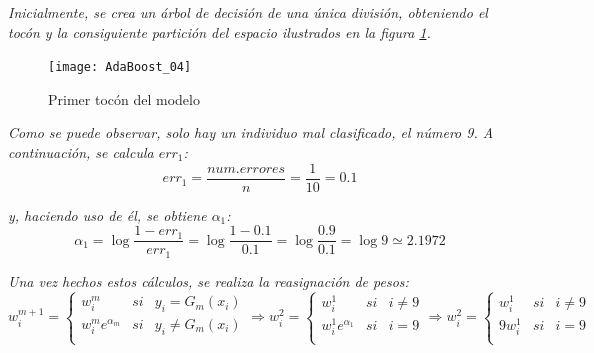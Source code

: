 \documentclass[12pt,twoside]{article}
\begin{document}
\textit{Inicialmente, se crea un árbol de decisión de una única división, obteniendo el tocón y la consiguiente partición del espacio ilustrados en la figura \ref{fig:AdaBoost_04}.}

\begin{figure}[h]
\centering
\texttt{[image: AdaBoost\_04]}
\caption{Primer tocón del modelo}
\label{fig:AdaBoost_04}
\end{figure}

\textit{Como se puede observar, solo hay un individuo mal clasificado, el número 9. A continuación, se calcula $err_1$:}
\begin{equation*}
err_1 = \frac{num.errores}{n} = \frac{1}{10} = 0.1
\end{equation*}

\noindent
\textit{y, haciendo uso de él, se obtiene $\alpha_1$:}
\begin{equation*}
\alpha_1 = \log{\frac{1 - err_1}{err_1}} = \log{\frac{1- 0.1}{0.1}} = \log{\frac{0.9}{0.1}} = \log{9} \simeq 2.1972
\end{equation*}

\textit{Una vez hechos estos cálculos, se realiza la reasignación de pesos:}
\begin{equation*}
w_i^{m+1} =
\left\{
\begin{array}{crl}
w_i^m & si & y_i = G_m(x_i) \\
w_i^m e^{\alpha_m} & si & y_i \neq G_m(x_i) \\
\end{array}
\right.
\Rightarrow
w_i^{2} =
\left\{
\begin{array}{crl}
w_i^1 & si & i \neq 9 \\
w_i^1 e^{\alpha_1} & si & i = 9 \\
\end{array}
\right.
\Rightarrow
w_i^{2} =
\left\{
\begin{array}{crl}
w_i^1 & si & i \neq 9 \\
9 w_i^1  & si & i = 9 \\
\end{array}
\right.
\end{equation*}
\end{document}
